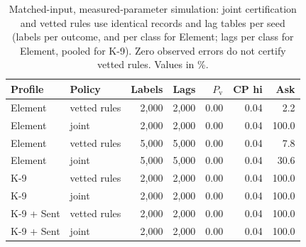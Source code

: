 \begin{table}[t]
\centering
\caption{Matched-input, measured-parameter simulation: joint certification and vetted rules use identical records and lag tables per seed (labels per outcome, and per class for Element; lags per class for Element, pooled for K-9). Zero observed errors do not certify vetted rules. Values in \%.}
\label{tab:matched}
\small
\begin{tabular}{@{}llrrrrr@{}}
\toprule
Profile & Policy & Labels & Lags & $P_{\mathrm v}$ & CP hi & Ask \\
\midrule
Element & vetted rules & 2{,}000 & 2{,}000 & 0.00 & 0.04 & 2.2 \\
Element & joint & 2{,}000 & 2{,}000 & 0.00 & 0.04 & 100.0 \\
Element & vetted rules & 5{,}000 & 5{,}000 & 0.00 & 0.04 & 7.8 \\
Element & joint & 5{,}000 & 5{,}000 & 0.00 & 0.04 & 30.6 \\
K-9 & vetted rules & 2{,}000 & 2{,}000 & 0.00 & 0.04 & 100.0 \\
K-9 & joint & 2{,}000 & 2{,}000 & 0.00 & 0.04 & 100.0 \\
K-9 + Sent & vetted rules & 2{,}000 & 2{,}000 & 0.00 & 0.04 & 100.0 \\
K-9 + Sent & joint & 2{,}000 & 2{,}000 & 0.00 & 0.04 & 100.0 \\
\bottomrule
\end{tabular}
\end{table}
